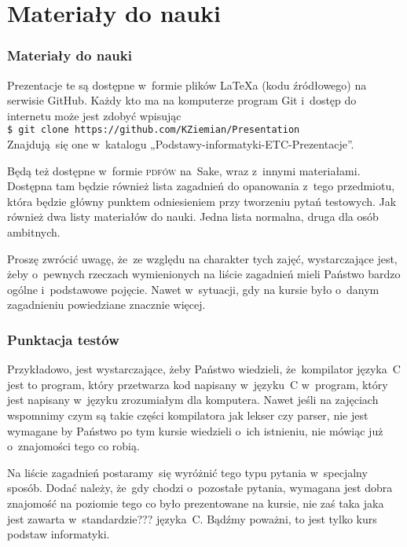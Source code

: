 \documentclass[10pt,t]{beamer}
\begin{document}
\section{Materiały do nauki}



\begin{frame}
  \frametitle{Materiały do nauki}


  Prezentacje te są dostępne w~formie plików \LaTeX a (kodu źródłowego)
  na serwisie GitHub. Każdy kto ma na komputerze program Git i~dostęp
  do internetu może jest zdobyć wpisując \\
  \texttt{\$ git clone https://github.com/KZiemian/Presentation} \\
  Znajdują~się one w~katalogu „Podstawy-informatyki-ETC-Prezentacje”.

  Będą też dostępne w~formie \textsc{pdfów} na~Sake, wraz z~innymi
  materiałami. Dostępna tam będzie również lista zagadnień do opanowania
  z~tego przedmiotu, która będzie główny punktem odniesieniem przy
  tworzeniu pytań testowych. Jak również dwa listy materiałów do nauki.
  Jedna lista normalna, druga dla osób ambitnych.

  Proszę zwrócić uwagę, że~ze względu na charakter tych zajęć, wystarczające
  jest, żeby o~pewnych rzeczach wymienionych na liście zagadnień mieli
  Państwo bardzo ogólne i~podstawowe pojęcie. Nawet w~sytuacji, gdy na
  kursie było o~danym zagadnieniu powiedziane znacznie więcej.

\end{frame}





\begin{frame}
  \frametitle{Punktacja testów}


  Przykładowo, jest wystarczające, żeby Państwo wiedzieli, że~kompilator
  języka~C jest to program, który przetwarza kod napisany w~języku~C
  w~program, który jest napisany w~języku zrozumiałym dla komputera.
  Nawet jeśli na zajęciach wspomnimy czym są takie części kompilatora
  jak lekser czy parser, nie jest wymagane by Państwo po tym kursie
  wiedzieli o~ich istnieniu, nie mówiąc już o~znajomości tego co robią.

  Na liście zagadnień postaramy~się wyróżnić tego typu pytania w~specjalny
  sposób. Dodać należy, że~gdy chodzi o~pozostałe pytania, wymagana jest
  dobra znajomość na \alert{poziomie tego co było prezentowane na kursie},
  nie zaś taka jaka jest zawarta w~standardzie??? języka~C. Bądźmy poważni,
  to jest tylko kurs podstaw informatyki.

\end{frame}
\end{document}
